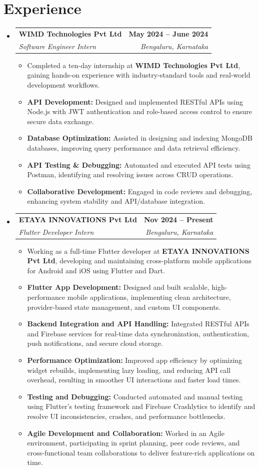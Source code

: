 \documentclass[a4paper,11pt]{article}
\makeatletter
\newcommand{\resumeItem}[1]{
	\item\small{#1 \vspace{-2pt}}
}
\newcommand{\resumeSubheading}[4]{
	\vspace{-2pt}\item
		\begin{tabular*}{0.97\textwidth}[t]{l@{\extracolsep{\fill}}r}
			\textbf{#1} & \textbf{\small #2} \\
			\textit{\small#3} & \textit{\small #4} \\
		\end{tabular*}\vspace{-7pt}
}
\newcommand{\resumeSubHeadingListStart}{\begin{itemize}[leftmargin=0.15in, label={}]}
\newcommand{\resumeSubHeadingListEnd}{\end{itemize}}
\newcommand{\resumeItemListStart}{\begin{itemize}}
\newcommand{\resumeItemListEnd}{\end{itemize}\vspace{-5pt}}
\makeatother
\begin{document}
\section{Experience}
\resumeSubHeadingListStart
\resumeSubheading
{WIMD Technologies Pvt Ltd}{May 2024 -- June 2024}
{Software Engineer Intern}{Bengaluru, Karnataka}
\resumeItemListStart
\resumeItem{Completed a ten-day internship at \textbf{WIMD Technologies Pvt Ltd}, gaining hands-on experience with industry-standard tools and real-world development workflows.}
\resumeItem{\textbf{API Development:} Designed and implemented RESTful APIs using Node.js with JWT authentication and role-based access control to ensure secure data exchange.}
\resumeItem{\textbf{Database Optimization:} Assisted in designing and indexing MongoDB databases, improving query performance and data retrieval efficiency.}
\resumeItem{\textbf{API Testing \& Debugging:} Automated and executed API tests using Postman, identifying and resolving issues across CRUD operations.}
\resumeItem{\textbf{Collaborative Development:} Engaged in code reviews and debugging, enhancing system stability and API/database integration.}
\resumeItemListEnd
\resumeSubheading
{ETAYA INNOVATIONS Pvt Ltd}{Nov 2024 -- Present}
{Flutter Developer Intern}{Bengaluru, Karnataka}
\resumeItemListStart
\resumeItem{Working as a full-time Flutter developer at \textbf{ETAYA INNOVATIONS Pvt Ltd}, developing and maintaining cross-platform mobile applications for Android and iOS using Flutter and Dart.}
\resumeItem{\textbf{Flutter App Development:} Designed and built scalable, high-performance mobile applications, implementing clean architecture, provider-based state management, and custom UI components.}
\resumeItem{\textbf{Backend Integration and API Handling:} Integrated RESTful APIs and Firebase services for real-time data synchronization, authentication, push notifications, and secure cloud storage.}
\resumeItem{\textbf{Performance Optimization:} Improved app efficiency by optimizing widget rebuilds, implementing lazy loading, and reducing API call overhead, resulting in smoother UI interactions and faster load times.}
\resumeItem{\textbf{Testing and Debugging:} Conducted automated and manual testing using Flutter’s testing framework and Firebase Crashlytics to identify and resolve UI inconsistencies, crashes, and performance bottlenecks.}
\resumeItem{\textbf{Agile Development and Collaboration:} Worked in an Agile environment, participating in sprint planning, peer code reviews, and cross-functional team collaborations to deliver feature-rich applications on time.}
\resumeItemListEnd
\resumeSubHeadingListEnd
\end{document}
